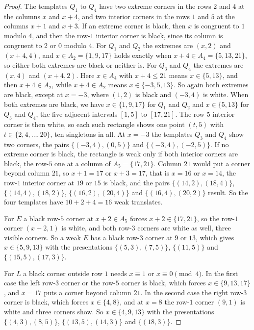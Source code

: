 \begin{proof}
The templates $Q_1$ to $Q_4$ have two extreme corners in the rows $2$ and $4$ at the
columns $x$ and $x+4$, and two interior corners in the rows $1$ and $5$ at the columns $x+1$
and $x+3$. If an extreme corner is black, then $x$ is congruent to $1$ modulo $4$, and then
the row-$1$ interior corner is black, since its column is congruent to $2$ or $0$ modulo $4$.
For $Q_1$ and $Q_2$ the extremes are $(x,2)$ and $(x+4,4)$, and $x\in A_2=\{1,9,17\}$
holds exactly when $x+4\in A_4=\{5,13,21\}$, so either both extremes are black or neither is.
For $Q_3$ and $Q_4$ the extremes are $(x,4)$ and $(x+4,2)$. Here $x\in A_4$ with
$x+4\le21$ means $x\in\{5,13\}$, and then $x+4\in A_2$, while $x+4\in A_2$ means
$x\in\{-3,5,13\}$. So again both extremes are black, except at $x=-3$, where $(1,2)$ is black
and $(-3,4)$ is white. When both extremes are black, we have $x\in\{1,9,17\}$ for $Q_1$ and
$Q_2$ and $x\in\{5,13\}$ for $Q_3$ and $Q_4$, the five adjacent intervals $[1,5]$ to
$[17,21]$. The row-$5$ interior corner is then white, so each such rectangle shows one point
$(t,5)$ with $t\in\{2,4,\dots,20\}$, ten singletons in all. At $x=-3$ the templates $Q_3$ and
$Q_4$ show two corners, the pairs $\{(-3,4),(0,5)\}$ and $\{(-3,4),(-2,5)\}$. If no extreme
corner is black, the rectangle is weak only if both interior corners are black, the row-$5$
one at a column of $A_5=\{17,21\}$. Column $21$ would put a corner beyond column $21$, so
$x+1=17$ or $x+3=17$, that is $x=16$ or $x=14$, the row-$1$ interior corner at $19$ or $15$
is black, and the pairs $\{(14,2),(18,4)\}$, $\{(14,4),(18,2)\}$, $\{(16,2),(20,4)\}$ and
$\{(16,4),(20,2)\}$ result. So the four templates have $10+2+4=16$ weak translates.

For $E$ a black row-$5$ corner at $x+2\in A_5$ forces $x+2\in\{17,21\}$, so the row-$1$
corner $(x+2,1)$ is white, and both row-$3$ corners are white as well, three visible corners.
So a weak $E$ has a black row-$3$ corner at $9$ or $13$, which gives $x\in\{5,9,13\}$ with the
presentations $\{(5,3),(7,5)\}$, $\{(11,5)\}$ and $\{(15,5),(17,3)\}$.

For $L$ a black corner outside row $1$ needs $x\equiv1$ or $x\equiv0\pmod4$. In the first case
the left row-$3$ corner or the row-$5$ corner is black, which forces $x\in\{9,13,17\}$, and
$x=17$ puts a corner beyond column $21$. In the second case the right row-$3$ corner is black,
which forces $x\in\{4,8\}$, and at $x=8$ the row-$1$ corner $(9,1)$ is white and three corners
show. So $x\in\{4,9,13\}$ with the presentations $\{(4,3),(8,5)\}$, $\{(13,5),(14,3)\}$ and
$\{(18,3)\}$.


\end{proof}
